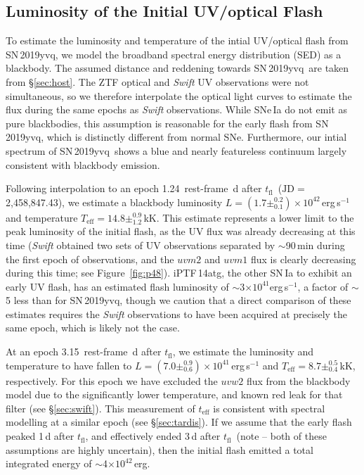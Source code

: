 \documentclass[twocolumn]{aastex63}
\newcommand{\tfl}{$t_\mathrm{fl}$}
\newcommand{\sn}{SN\,2019yvq}
\begin{document}
\subsection{Luminosity of the Initial UV/optical Flash}\label{sec:luminosity}

To estimate the luminosity and temperature of the intial UV/optical flash from
\sn, we model the broadband spectral energy distribution (SED) as a blackbody.
The assumed distance and reddening towards \sn\ are taken from
\S\ref{sec:host}. The ZTF optical and \textit{Swift} UV observations were not
simultaneous, so we therefore interpolate the optical light curves to estimate
the flux during the same epochs as \textit{Swift} observations. While SNe\,Ia
do not emit as pure blackbodies, this assumption is reasonable for the early
flash from \sn, which is distinctly different from normal SNe. Furthermore,
our intial spectrum of \sn\ shows a blue and nearly featureless continuum
largely consistent with blackbody emission.

Following interpolation to an epoch 1.24~rest-frame~d after \tfl\
($\mathrm{JD} = $2,458,847.43), we estimate a blackbody luminosity $L = (1.7
\pm ^{0.2}_{0.1}) \times 10^{42}$\,erg\,s$^{-1}$ and temperature
$T_\mathrm{eff} = 14.8 \pm^{0.9}_{1.2}$\,kK. This estimate represents a lower
limit to the peak luminosity of the initial flash, as the UV flux was already
decreasing at this time (\textit{Swift} obtained two sets of UV observations
separated by $\sim$90\,min during the first epoch of observations, and the
$uvm2$ and $uvm1$ flux is clearly decreasing during this time; see
Figure~\ref{fig:p48}). iPTF\,14atg, the other SN\,Ia to exhibit an early UV
flash, has an estimated flash luminosity of $\sim$3$ \times
10^{41}$erg\,s$^{-1}$, a factor of $\sim$5 less than for \sn, though we
caution that a direct comparison of these estimates requires the
\textit{Swift} observations to have been acquired at precisely the same epoch,
which is likely not the case.

At an epoch 3.15~rest-frame~d after \tfl, we estimate the luminosity and
temperature to have fallen to $L = (7.0 \pm ^{0.9}_{0.6}) \times
10^{41}$\,erg\,s$^{-1}$ and $T_\mathrm{eff} = 8.7 \pm^{0.5}_{0.4}$\,kK,
respectively. For this epoch we have excluded the $uvw2$ flux from the
blackbody model due to the significantly lower temperature, and known red leak
for that filter (see \S\ref{sec:swift}). This measurement of $t_\mathrm{eff}$
is consistent with spectral modelling at a similar epoch (see
\S\ref{sec:tardis}). If we assume that the early flash peaked 1\,d after \tfl,
and effectively ended 3\,d after \tfl\ (note -- both of these assumptions are
highly uncertain), then the initial flash emitted a total integrated energy of
$\sim$4$\times 10^{42}$\,erg.
\end{document}
